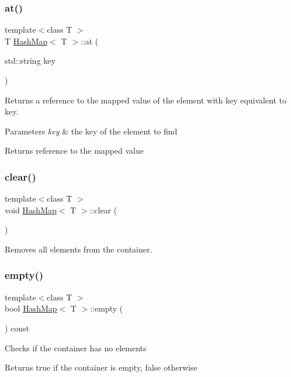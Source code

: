 \subsubsection{\texorpdfstring{at()}{at()}}
{\footnotesize\ttfamily template$<$class T $>$ \\
T \hyperlink{class_hash_map}{Hash\+Map}$<$ T $>$\+::at (\begin{DoxyParamCaption}\item[{std\+::string}]{key }\end{DoxyParamCaption})}

Returns a reference to the mapped value of the element with key equivalent to key. 
\begin{DoxyParams}{Parameters}
{\em key} & the key of the element to find \\
\hline
\end{DoxyParams}
\begin{DoxyReturn}{Returns}
reference to the mapped value 
\end{DoxyReturn}
\mbox{\label{class_hash_map_a7b78aa9f52a7524edc644920dc90fa94}} 
\subsubsection{\texorpdfstring{clear()}{clear()}}
{\footnotesize\ttfamily template$<$class T $>$ \\
void \hyperlink{class_hash_map}{Hash\+Map}$<$ T $>$\+::clear (\begin{DoxyParamCaption}{ }\end{DoxyParamCaption})}

Removes all elements from the container. \mbox{\label{class_hash_map_a6dfff726611e1ae80744fc54947b424b}} 
\subsubsection{\texorpdfstring{empty()}{empty()}}
{\footnotesize\ttfamily template$<$class T $>$ \\
bool \hyperlink{class_hash_map}{Hash\+Map}$<$ T $>$\+::empty (\begin{DoxyParamCaption}{ }\end{DoxyParamCaption}) const}

Checks if the container has no elements \begin{DoxyReturn}{Returns}
true if the container is empty, false otherwise 
\end{DoxyReturn}
\mbox{\label{class_hash_map_a31b525e08123f23108b7ad83e24f0b75}} 
